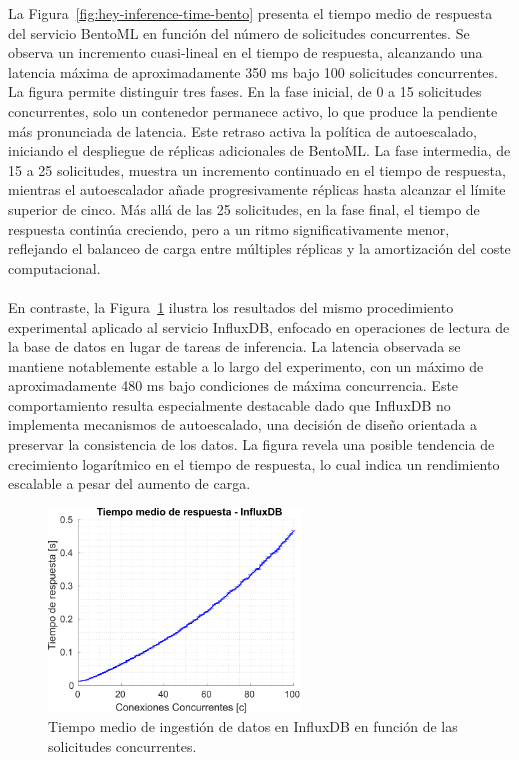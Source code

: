 La Figura~\ref{fig:hey-inference-time-bento} presenta el tiempo medio de respuesta del servicio BentoML en función del número de solicitudes concurrentes. Se observa un incremento cuasi-lineal en el tiempo de respuesta, alcanzando una latencia máxima de aproximadamente 350 ms bajo 100 solicitudes concurrentes. La figura permite distinguir tres fases. En la fase inicial, de 0 a 15 solicitudes concurrentes, solo un contenedor permanece activo, lo que produce la pendiente más pronunciada de latencia. Este retraso activa la política de autoescalado, iniciando el despliegue de réplicas adicionales de BentoML. La fase intermedia, de 15 a 25 solicitudes, muestra un incremento continuado en el tiempo de respuesta, mientras el autoescalador añade progresivamente réplicas hasta alcanzar el límite superior de cinco. Más allá de las 25 solicitudes, en la fase final, el tiempo de respuesta continúa creciendo, pero a un ritmo significativamente menor, reflejando el balanceo de carga entre múltiples réplicas y la amortización del coste computacional.\\
\\
En contraste, la Figura~\ref{fig:hey-inference-time-influx} ilustra los resultados del mismo procedimiento experimental aplicado al servicio InfluxDB, enfocado en operaciones de lectura de la base de datos en lugar de tareas de inferencia. La latencia observada se mantiene notablemente estable a lo largo del experimento, con un máximo de aproximadamente 480 ms bajo condiciones de máxima concurrencia. Este comportamiento resulta especialmente destacable dado que InfluxDB no implementa mecanismos de autoescalado, una decisión de diseño orientada a preservar la consistencia de los datos. La figura revela una posible tendencia de crecimiento logarítmico en el tiempo de respuesta, lo cual indica un rendimiento escalable a pesar del aumento de carga.

\begin{figure}[ht!]
    \centering
    \includegraphics[width=0.6\textwidth]{fig/08_datadriven/datadriven_13.pdf}
    \caption{Tiempo medio de ingestión de datos en InfluxDB en función de las solicitudes concurrentes.}
    \label{fig:hey-inference-time-influx}
\end{figure}

